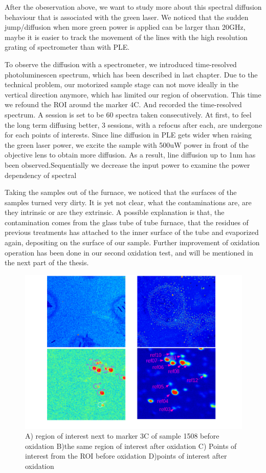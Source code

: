 After the obeservation above, we want to study more about this spectral diffusion behaviour that is associated with the green laser. We noticed that the sudden jump/diffusion when more green power is applied can be larger than 20GHz, maybe it is easier to track the movement of the lines with the high resolution grating of spectrometer than with PLE.

To observe the diffusion with a spectrometer, we introduced time-resolved photoluminescen spectrum, which has been described in last chapter. Due to the technical problem, our motorized sample stage can not move ideally in the vertical direction anymore, which has limited our region of observation. This time we refound the ROI around the marker 4C. And recorded the time-resolved spectrum. A session is set to be 60 spectra taken consecutively. At first, to feel the long term diffusing better, 3 sessions, with a refocus after each, are undergone for each points of interests. Since line diffusion in PLE gets wider when raising the green laser power, we excite the sample with 500uW power in front of the objective lens to obtain more diffusion. As a result, line diffusion up to 1nm has been observed.Sequentially we decrease the input power to examine the power dependency of spectral

Taking the samples out of the furnace, we noticed that the surfaces of the samples turned very dirty. It is yet not clear, what the contaminations are, are they intrinsic or are they extrinsic. A possible explanation is that, the contamination comes from the glass tube of tube furnace, that the residues of previous treatments has attached to the inner surface of the tube and evaporized again, depositing on the surface of our sample. Further improvement of oxidation operation has been done in our second oxidation test, and will be mentioned in the next part of the thesis.
\begin{figure}[h]
\centering
\includegraphics[width=0.7\linewidth]{Figures/pic/oxidation}
\caption{A) region of interest next to marker 3C of sample 1508 before oxidation B)the same region of interest after oxidation C) Points of interest from the ROI before oxidation D)points of interest after oxidation}
\label{fig:oxidation}
\end{figure}

